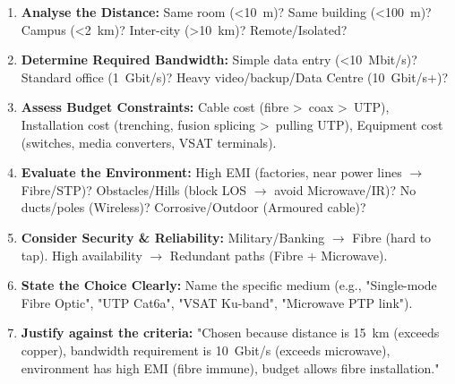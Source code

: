 \documentclass[11pt]{article}
\begin{document}
\begin{methode}
\begin{enumerate}
\item \textbf{Analyse the Distance:} Same room (\SI{<10}{m})? Same building (\SI{<100}{m})? Campus (\SI{<2}{km})? Inter-city (\SI{>10}{km})? Remote/Isolated?
\item \textbf{Determine Required Bandwidth:} Simple data entry (\SI{<10}{Mbit/s})? Standard office (\SI{1}{Gbit/s})? Heavy video/backup/Data Centre (\SI{10}{Gbit/s}+)?
\item \textbf{Assess Budget Constraints:} Cable cost (fibre \textgreater\ coax \textgreater\ UTP), Installation cost (trenching, fusion splicing \textgreater\ pulling UTP), Equipment cost (switches, media converters, VSAT terminals).
\item \textbf{Evaluate the Environment:} High EMI (factories, near power lines $\rightarrow$ Fibre/STP)? Obstacles/Hills (block LOS $\rightarrow$ avoid Microwave/IR)? No ducts/poles (Wireless)? Corrosive/Outdoor (Armoured cable)?
\item \textbf{Consider Security \& Reliability:} Military/Banking $\rightarrow$ Fibre (hard to tap). High availability $\rightarrow$ Redundant paths (Fibre + Microwave).
\item \textbf{State the Choice Clearly:} Name the specific medium (e.g., "Single-mode Fibre Optic", "UTP Cat6a", "VSAT Ku-band", "Microwave PTP link").
\item \textbf{Justify against the criteria:} "Chosen because distance is \SI{15}{km} (exceeds copper), bandwidth requirement is \SI{10}{Gbit/s} (exceeds microwave), environment has high EMI (fibre immune), budget allows fibre installation."
\end{enumerate}
\end{methode}
\end{document}
